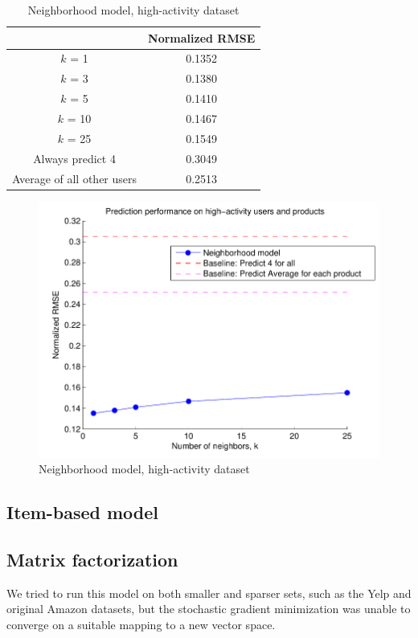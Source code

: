 \documentclass[letterpaper, 11 pt, conference]{ieeeconf}
\begin{document}
\begin{table}[htb]
\centering
\begin{tabular}{|c|c|}
\cline{2-2}

\multicolumn{1}{c|}{}  & {Normalized RMSE} \tabularnewline \hline
$k$ = 1 & 0.1352  \tabularnewline
$k$ = 3 & 0.1380 \tabularnewline
$k$ = 5 &  0.1410 \tabularnewline
$k$ = 10 &  0.1467 \tabularnewline
$k$ = 25  &  0.1549 \tabularnewline
\hline
Always predict 4 & 0.3049 \tabularnewline 
Average of all other users & 0.2513 \tabularnewline
\hline
\end{tabular}
\caption{Neighborhood model, high-activity dataset}
\label{table:modelone_subset}
\end{table}

\begin{figure}[h]
\includegraphics[scale=0.6]{images/modelone_subset.pdf}
\caption{Neighborhood model, high-activity dataset}
\label{fig:modelone_subset}
\end{figure}

\subsection{Item-based model}

\subsection{Matrix factorization}
We tried to run this model on both smaller and sparser sets, such as the Yelp and 
original Amazon datasets, but the stochastic gradient minimization was unable to
converge on a suitable mapping to a new vector space.
\end{document}
